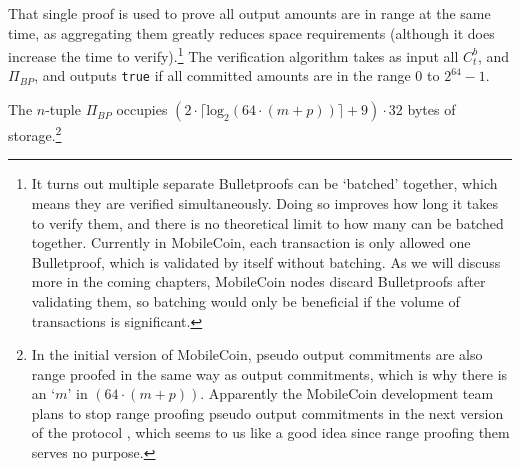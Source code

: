 That single proof is used to prove all output amounts are in range at the same time, as aggregating them greatly reduces space requirements (although it does increase the time to verify).\footnote{It turns out multiple separate Bulletproofs can be `batched' together, which means they are verified simultaneously. Doing so improves how long it takes to verify them, and there is no theoretical limit to how many can be batched together. Currently in MobileCoin, each transaction is only allowed one Bulletproof, which is validated by itself without batching. As we will discuss more in the coming chapters, MobileCoin nodes discard Bulletproofs after validating them, so batching would only be beneficial if the volume of transactions is significant.} The verification algorithm takes as input all $C^b_t$, and $\Pi_{BP}$, and outputs {\tt true} if all committed amounts are in the range 0 to $2^{64} - 1$.

The $n$-tuple $\Pi_{BP}$ occupies $(2 \cdot \lceil \textrm{log}_2(64 \cdot (m + p)) \rceil + 9) \cdot 32$ bytes of storage.\footnote{\label{footnote:commitments-pseudo-output-commit-range-proofs}In the initial version of MobileCoin, pseudo output commitments are also range proofed in the same way as output commitments, which is why there is an `$m$' in $(64 \cdot (m + p))$. Apparently the MobileCoin development team plans to stop range proofing pseudo output commitments in the next version of the protocol \cite{mc-pull-request-revert-remove-pseudo-output-from-range-proof}, which seems to us like a good idea since range proofing them serves no purpose.}